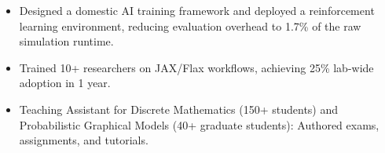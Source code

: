 {{\begin{itemize}
			\item Designed a domestic AI training framework and deployed a reinforcement learning environment, reducing evaluation overhead to 1.7\% of the raw simulation runtime.
			\item Trained 10+ researchers on JAX/Flax workflows, achieving 25\% lab-wide adoption in 1 year.
			\item Teaching Assistant for Discrete Mathematics (150+ students) and Probabilistic Graphical Models (40+ graduate students): Authored exams, assignments, and tutorials.
		\end{itemize}
	}%
}

